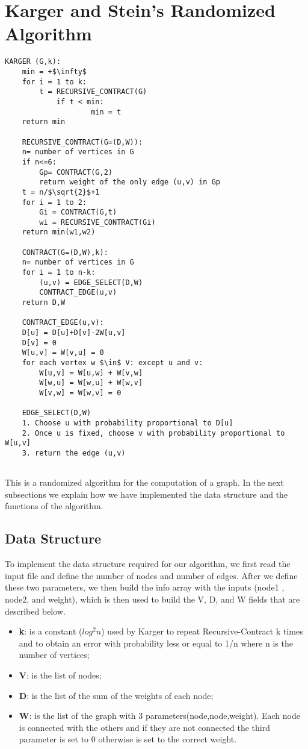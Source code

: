 \section{Karger and Stein's Randomized Algorithm}\label{karger}

\begin{lstlisting}[mathescape=true]
	KARGER (G,k):
	min = +$\infty$
	for i = 1 to k:		
		t = RECURSIVE_CONTRACT(G)		
			if t < min:
					min = t
	return min
	
	RECURSIVE_CONTRACT(G=(D,W)):
	n= number of vertices in G
	if n<=6:
		Gp= CONTRACT(G,2)
		return weight of the only edge (u,v) in Gp
	t = n/$\sqrt{2}$+1
	for i = 1 to 2:
		Gi = CONTRACT(G,t)
		wi = RECURSIVE_CONTRACT(Gi)
	return min(w1,w2)
	
	CONTRACT(G=(D,W),k):
	n= number of vertices in G
	for i = 1 to n-k:
		(u,v) = EDGE_SELECT(D,W)
		CONTRACT_EDGE(u,v)
	return D,W
	
	CONTRACT_EDGE(u,v):
	D[u] = D[u]+D[v]-2W[u,v]
	D[v] = 0
	W[u,v] = W[v,u] = 0
	for each vertex w $\in$ V: except u and v:
		W[u,v] = W[u,w] + W[v,w]
		W[w,u] = W[w,u] + W[w,v]
		W[v,w] = W[w,v] = 0
		
	EDGE_SELECT(D,W)
	1. Choose u with probability proportional to D[u]
	2. Once u is fixed, choose v with probability proportional to W[u,v]
	3. return the edge (u,v)
	
\end{lstlisting}

This is a randomized algorithm for the computation of a graph.
In the next subsections we explain how we have implemented the data structure and the functions of the algorithm.

\pagebreak

\subsection{Data Structure}
To implement the data structure required for our algorithm, we first read the input file and define the number of nodes and number of edges.
After we define these two parameters, we then build the info array with the inputs (node1 , node2, and weight), which is then used to build the V, D, and W fields that are described below.
\begin{itemize}
	\item  \textbf{k}: is a constant ($log^2n$) used by Karger to repeat Recursive-Contract k times and to obtain an error with probability less or equal to 1/n where n is the number of vertices;
	\item  \textbf{V}: is the list of nodes;
	\item  \textbf{D}: is the list of the sum of the weights of each node;
	\item  \textbf{W}: is the list of the graph with 3 parameters(node,node,weight). Each node is connected with the others and if they are not connected the third parameter is set to 0 otherwise is set to the correct weight.
\end{itemize}



